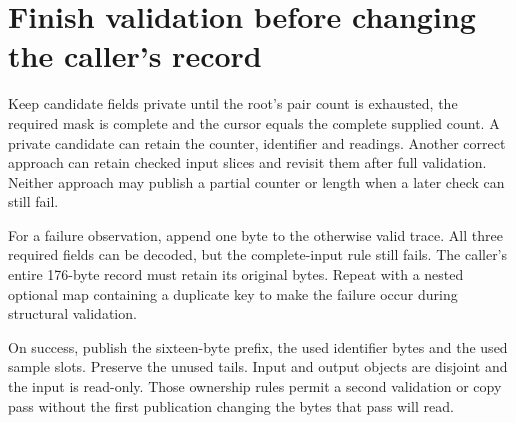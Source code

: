 \section{Finish validation before changing the caller's record}
Keep candidate fields private until the root's pair count is exhausted, the required
mask is complete and the cursor equals the complete supplied count. A private candidate
can retain the counter, identifier and readings. Another correct approach can retain
checked input slices and revisit them after full validation. Neither approach may
publish a partial counter or length when a later check can still fail.

For a failure observation, append one byte to the otherwise valid trace. All three
required fields can be decoded, but the complete-input rule still fails. The caller's
entire 176-byte record must retain its original bytes. Repeat with a nested optional
map containing a duplicate key to make the failure occur during structural validation.

On success, publish the sixteen-byte prefix, the used identifier bytes and the used
sample slots. Preserve the unused tails. Input and output objects are disjoint and the
input is read-only. Those ownership rules permit a second validation or copy pass
without the first publication changing the bytes that pass will read.
